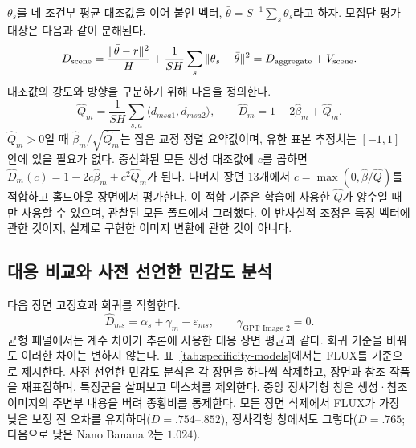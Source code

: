 \documentclass[11pt,a4paper]{article}
\begin{document}
$\theta_s$를 네 조건부 평균 대조값을 이어 붙인 벡터, $\bar\theta=S^{-1}\sum_s\theta_s$라고 하자. 모집단 평가 대상은 다음과 같이 분해된다.
\begin{equation}
 D_{\rm scene}=\frac{\|\bar\theta-r\|^2}{H}
 +\frac1{SH}\sum_s\|\theta_s-\bar\theta\|^2
 =D_{\rm aggregate}+V_{\rm scene}.
 \label{eq:scene-decomposition}
\end{equation}
대조값의 강도와 방향을 구분하기 위해 다음을 정의한다.
\begin{equation}
 \widehat Q_m=\frac1{SH}\sum_{s,a}\langle d_{msa1},d_{msa2}\rangle,
 \qquad \widehat D_m=1-2\widehat\beta_m+\widehat Q_m.
 \label{eq:magnitude}
\end{equation}
$\widehat Q_m>0$일 때 $\widehat\beta_m/\sqrt{\widehat Q_m}$는 잡음 교정 정렬 요약값이며, 유한 표본 추정치는 $[-1,1]$ 안에 있을 필요가 없다. 중심화된 모든 생성 대조값에 $c$를 곱하면 $\widehat D_m(c)=1-2c\widehat\beta_m+c^2\widehat Q_m$가 된다. 나머지 장면 13개에서 $c=\max(0,\widehat\beta/\widehat Q)$를 적합하고 홀드아웃 장면에서 평가한다. 이 적합 기준은 학습에 사용한 $\widehat Q$가 양수일 때만 사용할 수 있으며, 관찰된 모든 폴드에서 그러했다. 이 반사실적 조정은 특징 벡터에 관한 것이지, 실제로 구현한 이미지 변환에 관한 것이 아니다.

\subsection{대응 비교와 사전 선언한 민감도 분석}\label{app:declared-sensitivities}
다음 장면 고정효과 회귀를 적합한다.
\begin{equation}
 \widehat D_{ms}=\alpha_s+\gamma_m+\varepsilon_{ms},
 \qquad\gamma_{\text{GPT Image 2}}=0.
 \label{eq:regression}
\end{equation}
균형 패널에서는 계수 차이가 추론에 사용한 대응 장면 평균과 같다. 회귀 기준을 바꿔도 이러한 차이는 변하지 않는다. 표~\ref{tab:specificity-models}에서는 FLUX를 기준으로 제시한다. 사전 선언한 민감도 분석은 각 장면을 하나씩 삭제하고, 장면과 참조 작품을 재표집하며, 특징군을 살펴보고 텍스처를 제외한다. 중앙 정사각형 창은 생성·참조 이미지의 주변부 내용을 버려 종횡비를 통제한다. 모든 장면 삭제에서 FLUX가 가장 낮은 보정 전 오차를 유지하며($D=.754$--$.852$), 정사각형 창에서도 그렇다($D=.765$; 다음으로 낮은 Nano Banana 2는 $1.024$).
\end{document}
